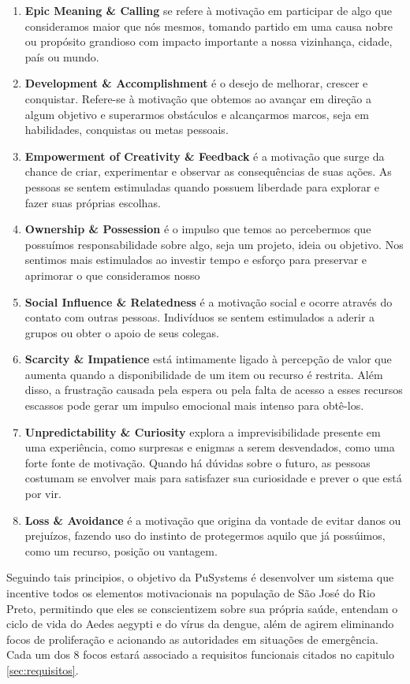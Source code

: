 \documentclass[a4paper, 12pt]{article}
\begin{document}
\begin{enumerate}
    \item \textbf{Epic Meaning \& Calling} se refere à motivação em participar de algo que consideramos maior que nós mesmos, tomando partido em uma causa nobre ou propósito grandioso com impacto importante a nossa vizinhança, cidade, país ou mundo. 
    \item \textbf{Development \& Accomplishment} é o desejo de melhorar, crescer e conquistar. Refere-se à motivação que obtemos ao avançar em direção a algum objetivo e superarmos obstáculos e alcançarmos marcos, seja em habilidades, conquistas ou metas pessoais.
    \item \textbf{Empowerment of Creativity \& Feedback} é a motivação que surge da chance de criar, experimentar e observar as consequências de suas ações. As pessoas se sentem estimuladas quando possuem liberdade para explorar e fazer suas próprias escolhas. 
    \item \textbf{Ownership \& Possession} é o impulso que temos ao percebermos que possuímos responsabilidade sobre algo, seja um projeto, ideia ou objetivo. Nos sentimos mais estimulados ao investir tempo e esforço para preservar e aprimorar o que consideramos nosso
    \item \textbf{Social Influence \& Relatedness} é a motivação social e ocorre através do contato com outras pessoas. Indivíduos se sentem estimulados a aderir a grupos ou  obter o apoio de seus colegas. 
    \item \textbf{Scarcity \& Impatience} está intimamente ligado à percepção de valor que aumenta quando a disponibilidade de um item ou recurso é restrita. Além disso, a frustração causada pela espera ou pela falta de acesso a esses recursos escassos pode gerar um impulso emocional mais intenso para obtê-los.
    \item \textbf{Unpredictability \& Curiosity} explora a imprevisibilidade presente em uma experiência, como surpresas e enigmas a serem desvendados, como uma forte fonte de motivação. Quando há dúvidas sobre o futuro, as pessoas costumam se envolver mais para satisfazer sua curiosidade e prever o que está por vir.
    \item \textbf{Loss \& Avoidance} é a motivação que origina da vontade de evitar danos ou prejuízos, fazendo uso do instinto de protegermos aquilo que já possúimos, como um recurso, posição ou vantagem.
\end{enumerate}

Seguindo tais principios, o objetivo da PuSystems é desenvolver um sistema que incentive todos os elementos motivacionais na população de São José do Rio Preto, permitindo que eles se conscientizem sobre sua própria saúde, entendam o ciclo de vida do Aedes aegypti e do vírus da dengue, além de agirem eliminando focos de proliferação e acionando as autoridades em situações de emergência. Cada um dos 8 focos estará associado a requisitos funcionais citados no capitulo \ref{sec:requisitos}.
\end{document}
